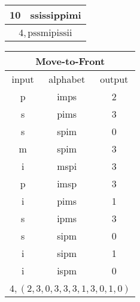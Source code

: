 \begin{figure*}
\begin{center}
\begin{tabular}{c|c}
    10 & ssissippimi \\
    \hline
    \multicolumn{2}{c}{} \\
    \multicolumn{2}{c}{$4, \text{pssmipissii}$} \\
  \end{tabular}
  \hspace*{0.5cm}
  \begin{tabular}{c|c|c}
    \multicolumn{3}{c}{Move-to-Front} \\
    \hline
    input & alphabet & output \\
    \hline
    p & imps & 2 \\
    s & pims & 3 \\
    s & spim & 0 \\
    m & spim & 3 \\
    i & mspi & 3 \\
    p & imsp & 3 \\
    i & pims & 1 \\
    s & ipms & 3 \\
    s & sipm & 0 \\
    i & sipm & 1 \\
    i & ispm & 0 \\
    \hline
    \multicolumn{3}{c}{} \\
    \multicolumn{3}{c}{$4, (2,3,0,3,3,3,1,3,0,1,0)$} \\
  \end{tabular}
  \end{center}
  \caption{$BWC(\text{mississippi})$}
\end{figure*}

